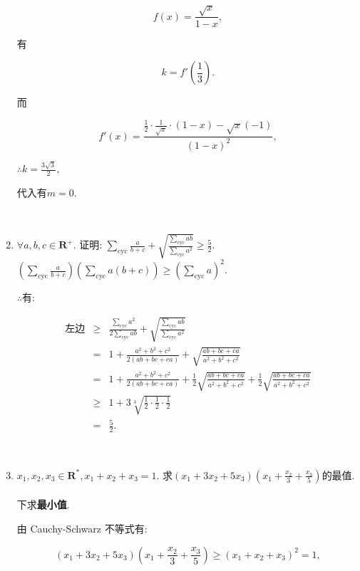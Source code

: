 \documentclass[8pt]{article}
\begin{document}
\begin{enumerate}
			$$f(x)=\frac{\sqrt{x}}{1-x},$$

			有

			$$k=f'\left(\frac{1}{3}\right).$$

			而

			$$f'(x)=\frac{\frac{1}{2}\cdot\frac{1}{\sqrt{x}}\cdot(1-x)-\sqrt{x}(-1)}{(1-x)^2},$$

			$\therefore k=\frac{3\sqrt{3}}{2},$

			代入有$m=0.$

		~\\

		\item $\forall a, b, c\in\mathbf{R}^{+}$. 证明: $\displaystyle \sum_{\mathrm{cyc}} \frac{a}{b+c} + \sqrt{\frac{\sum_{\mathrm{cyc}}ab}{\sum_{\mathrm{cyc}}a^2}}\geq \frac{5}{2}.$
			~\\

			$\displaystyle \left(\sum_{\mathrm{cyc}} \frac{a}{b+c}\right)\left(\sum_{\mathrm{cyc}}a(b+c)\right) \geq \left(\sum_{\mathrm{cyc}}a\right)^2.$

			$\therefore$有:

			$$
			\begin{array}{rcl}
			\text{左边}&\geq&\displaystyle \frac{\sum_{\mathrm{cyc}}a^2}{2\sum_{\mathrm{cyc}}ab}+\sqrt{\frac{\sum_{\mathrm{cyc}}ab}{\sum_{\mathrm{cyc}}a^2}}\\
			&=&\displaystyle 1+\frac{a^2+b^2+c^2}{2(ab+bc+ca)}+\sqrt{\frac{ab+bc+ca}{a^2+b^2+c^2}}\\
			&=&\displaystyle 1+\frac{a^2+b^2+c^2}{2(ab+bc+ca)}+\frac{1}{2}\sqrt{\frac{ab+bc+ca}{a^2+b^2+c^2}}+\frac{1}{2}\sqrt{\frac{ab+bc+ca}{a^2+b^2+c^2}}\\
			&\geq&\displaystyle 1+3\sqrt[3]{\frac{1}{2}\cdot\frac{1}{2}\cdot\frac{1}{2}}\\
			&=&\displaystyle \frac{5}{2}.
			\end{array}
			$$

		~\\

		\item $x_1, x_2, x_3 \in \mathbf{R}^{*}, x_1+x_2+x_3=1$. 求$\displaystyle (x_1+3x_2+5x_3)\left(x_1+\frac{x_2}{3}+\frac{x_3}{5}\right)$的最值.
			~\\

			下求\textbf{最小值}.

			由 Cauchy-Schwarz 不等式有:

			$$
			(x_1+3x_2+5x_3)\left(x_1+\frac{x_2}{3}+\frac{x_3}{5}\right)\geq(x_1+x_2+x_3)^2=1,
			$$


\end{enumerate}
\end{document}
